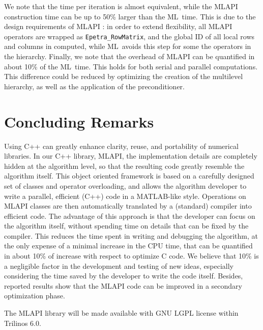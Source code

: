 \documentclass{article}[11pt]
\newcommand{\ML}     {{\sc ML}}
\newcommand{\MLAPI}  {{\sc MLAPI }}
\newcommand{\mlapi}  {{\sc MLAPI }}
\newcommand{\MLAPIns}  {{\sc MLAPI}}
\begin{document}
We note that the time per iteration is almost equivalent, while the
\mlapi construction time can be up to 50\% larger than the \ML\ time. This is
due to the design requirements of \MLAPI: in order to extend flexibility, all
\MLAPI operators are wrapped as {\tt Epetra\_RowMatrix}, and the global ID of
all local rows and columns in computed, while \ML\ avoids this step for some the
operators in the hierarchy. Finally, we note that the overhead of \mlapi 
can be quantified in about 10\%
of the \ML\ time. This holds for both serial and parallel computations. This
difference could be reduced by optimizing the creation of the multilevel
hierarchy, as well as the application of the preconditioner.

\section{Concluding Remarks}
\label{sec:conclusions}

Using C++ can greatly enhance clarity, reuse, and
portability of numerical libraries. In our C++  library, \MLAPIns, 
  the implementation details are completely hidden at
the algorithm level, so that the resulting code greatly resemble the 
algorithm itself. This object oriented framework is based on a
carefully designed set of classes and operator overloading, and allows the
algorithm developer to write a parallel, efficient (C++) code in a MATLAB-like
style. Operations on \MLAPI classes are then automatically translated by a
(standard) compiler into efficient code.  The advantage of this approach is
that the developer can focus on the algorithm itself, without spending time on
details that can be fixed by the compiler. This reduces the time spent in
writing and debugging the algorithm, at the only expense of a minimal increase
in the CPU time, that can be quantified in about 10\% of increase with respect
to optimize C code. We believe that 10\% is a negligible 
factor in the development and testing of new
ideas, especially considering the time saved by the developer to write the
code itself. Besides, reported results show that the \MLAPI code can be
improved in a secondary optimization phase.

\smallskip

The \MLAPI library will be made available with GNU LGPL license within
Trilinos 6.0.

\end{document}
